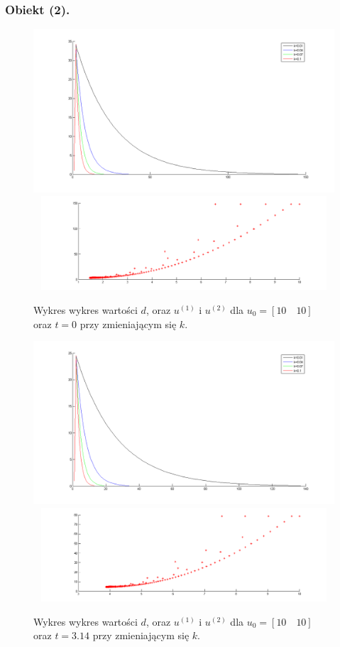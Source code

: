 \documentclass[a4paper,10pt]{article}
\begin{document}
\subsubsection{Obiekt (2).}



\begin{figure}[!h]
    \centering
	\includegraphics[width=120mm]{CW4-alg2fun2-u10_10-k001_01-t0-d.png}
	\includegraphics[width=120mm,height=35mm]{CW4-alg2fun2-u10_10-k001_01-t0-u.png}
	\caption{Wykres wykres wartości $d$, oraz $u^{(1)}$ i $u^{(2)}$ dla $u_0=[10 \quad 10]$ oraz $t=0$ przy zmieniającym się $k$.}
    \label{fig:Rysunek}
\end{figure}
\begin{figure}[!h]
    \centering
	\includegraphics[width=120mm]{CW4-alg2fun2-u10_10-k001_01-t314-d.png}
	\includegraphics[width=120mm,height=35mm]{CW4-alg2fun2-u10_10-k001_01-t314-u.png}
	\caption{Wykres wykres wartości $d$, oraz $u^{(1)}$ i $u^{(2)}$ dla $u_0=[10 \quad 10]$ oraz $t=3.14$ przy zmieniającym się $k$.}
    \label{fig:Rysunek}
\end{figure}
\end{document}
